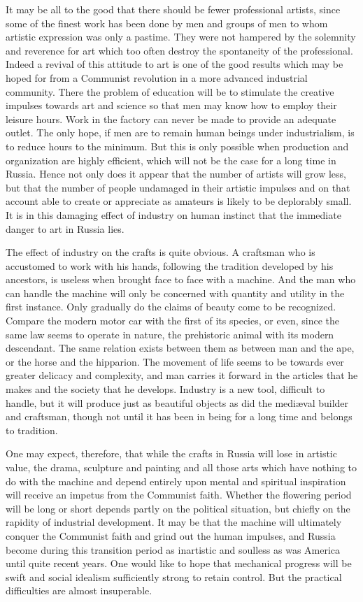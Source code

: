 It may be all to the good that there should be fewer professional artists, since some of the finest work has been done by men and groups of men to whom artistic expression was only a pastime. They were not hampered by the solemnity and reverence for art which too often destroy the spontaneity of the professional. Indeed a revival of this attitude to art is one of the good results which may be hoped for from a Communist revolution in a more advanced industrial community. There the problem of education will be to stimulate the creative impulses towards art and science so that men may know how to employ their leisure hours. Work in the factory can never be made to provide an adequate outlet. The only hope, if men are to remain human beings under industrialism, is to reduce hours to the minimum. But this is only possible when production and organization are highly efficient, which will not be the case for a long time in Russia. Hence not only does it appear that the number of artists will grow less, but that the number of people undamaged in their artistic impulses and on that account able to create or appreciate as amateurs is likely to be deplorably small. It is in this damaging effect of industry on human instinct that the immediate danger to art in Russia lies.

The effect of industry on the crafts is quite obvious. A craftsman who is accustomed to work with his hands, following the tradition developed by his ancestors, is useless when brought face to face with a machine. And the man who can handle the machine will only be concerned with quantity and utility in the first instance. Only gradually do the claims of beauty come to be recognized. Compare the modern motor car with the first of its species, or even, since the same law seems to operate in nature, the prehistoric animal with its modern descendant. The same relation exists between them as between man and the ape, or the horse and the hipparion. The movement of life seems to be towards ever greater delicacy and complexity, and man carries it forward in the articles that he makes and the society that he develops. Industry is a new tool, difficult to handle, but it will produce just as beautiful objects as did the mediæval builder and craftsman, though not until it has been in being for a long time and belongs to tradition.

One may expect, therefore, that while the crafts in Russia will lose in artistic value, the drama, sculpture and painting and all those arts which have nothing to do with the machine and depend entirely upon mental and spiritual inspiration will receive an impetus from the Communist faith. Whether the flowering period will be long or short depends partly on the political situation, but chiefly on the rapidity of industrial development. It may be that the machine will ultimately conquer the Communist faith and grind out the human impulses, and Russia become during this transition period as inartistic and soulless as was America until quite recent years. One would like to hope that mechanical progress will be swift and social idealism sufficiently strong to retain control. But the practical difficulties are almost insuperable.

